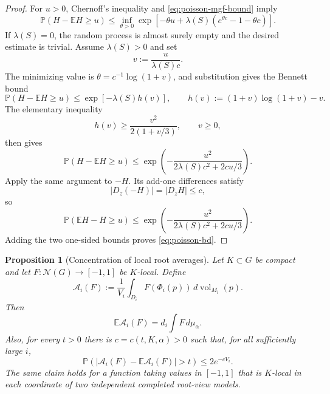 \documentclass[12pt]{amsart}
\newtheorem{proposition}[proposition]{Proposition}
\theoremstyle{definition}
\newcommand{\vol}{\operatorname{vol}}
\newcommand{\cN}{\mathcal N}
\newcommand{\1}{\mathbf 1}
\newcommand{\dd}{\,d}
\newcommand{\abs}[1]{\left\lvert#1\right\rvert}
\begin{document}
\begin{proof}
For $u>0$, Chernoff's inequality and \eqref{eq:poisson-mgf-bound} imply
\[
 \mathbb P(H-\mathbb EH\geq u)
 \leq\inf_{\theta>0}
 \exp\left[-\theta u+\lambda(S)(e^{\theta c}-1-\theta c)\right].
\]
If $\lambda(S)=0$, the random process is almost surely empty and the desired estimate is trivial. Assume $\lambda(S)>0$ and set
\[
 v:=\frac{u}{\lambda(S)c}.
\]
The minimizing value is $\theta=c^{-1}\log(1+v)$, and substitution gives the Bennett bound
\begin{equation}\label{eq:Bennett-upper}
 \mathbb P(H-\mathbb EH\geq u)
 \leq\exp[-\lambda(S)h(v)],
 \qquad
 h(v):=(1+v)\log(1+v)-v.
\end{equation}
The elementary inequality
\begin{equation}\label{eq:h-Bernstein}
 h(v)\geq\frac{v^2}{2(1+v/3)},\qquad v\geq0,
\end{equation}
then gives
\begin{equation}\label{eq:poisson-upper-Bernstein}
 \mathbb P(H-\mathbb EH\geq u)
 \leq
 \exp\left(-\frac{u^2}{2\lambda(S)c^2+2cu/3}\right).
\end{equation}
Apply the same argument to $-H$. Its add-one differences satisfy
\[
 |D_z(-H)|=|D_zH|\leq c,
\]
so
\[
 \mathbb P(\mathbb EH-H\geq u)
 \leq
 \exp\left(-\frac{u^2}{2\lambda(S)c^2+2cu/3}\right).
\]
Adding the two one-sided bounds proves \eqref{eq:poisson-bd}.
\end{proof}

\begin{proposition}[Concentration of local root averages]\label{prop:local-concentration}
Let $K\subset G$ be compact and let $F:\cN(G)\to[-1,1]$ be $K$-local. Define
\[
 \mathcal A_i(F):=\frac1{V_i}\int_{D_i}F(\Phi_i(p))\dd\vol_{M_i}(p).
\]
Then
\begin{equation}\label{eq:local-mean}
 \mathbb E\mathcal A_i(F)=d_i\int F\dd\mu_\alpha.
\end{equation}
Also, for every $t>0$ there is $c=c(t,K,\alpha)>0$ such that, for all sufficiently large $i$,
\begin{equation}\label{eq:local-concentration}
 \mathbb P\left(\abs{\mathcal A_i(F)-\mathbb E\mathcal A_i(F)}>t\right)
 \leq2e^{-cV_i}.
\end{equation}
The same claim holds for a function taking values in $[-1,1]$ that is
$K$-local in each coordinate of two independent completed root-view models.
\end{proposition}
\end{document}
